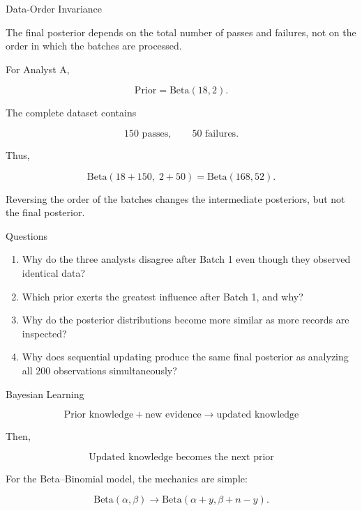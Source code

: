 \begin{frame}{Data-Order Invariance}

The final posterior depends on the total number of passes and
failures, not on the order in which the batches are processed.

\vspace{0.3cm}

For Analyst A,

\[
\text{Prior} = \mathrm{Beta}(18,2).
\]

The complete dataset contains

\[
150 \text{ passes},
\qquad
50 \text{ failures}.
\]

Thus,

\[
\mathrm{Beta}(18+150,\;2+50)
=
\mathrm{Beta}(168,52).
\]

\vspace{0.2cm}

Reversing the order of the batches changes the intermediate
posteriors, but not the final posterior.

\end{frame}

\begin{frame}{Questions}

\begin{enumerate}

  \item Why do the three analysts disagree after Batch 1 even though
        they observed identical data?

  \item Which prior exerts the greatest influence after Batch 1,
        and why?

  \item Why do the posterior distributions become more similar as
        more records are inspected?

  \item Why does sequential updating produce the same final posterior
        as analyzing all 200 observations simultaneously?

\end{enumerate}

\end{frame}

\begin{frame}{Bayesian Learning}

\[
\boxed{
\text{Prior knowledge}
+
\text{new evidence}
\longrightarrow
\text{updated knowledge}
}
\]

\vspace{0.45cm}

Then,

\[
\boxed{
\text{Updated knowledge becomes the next prior}
}
\]

\vspace{0.45cm}

For the Beta--Binomial model, the mechanics are simple:

\[
\mathrm{Beta}(\alpha,\beta)
\longrightarrow
\mathrm{Beta}(\alpha+y,\beta+n-y).
\]

\end{frame}

